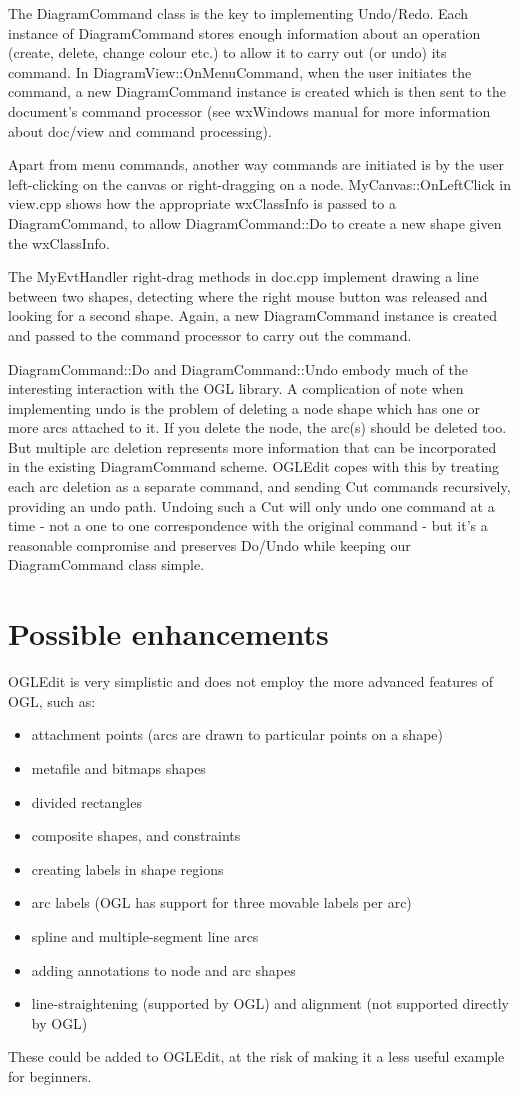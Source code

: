 The DiagramCommand class is the key to implementing Undo/Redo. Each instance of DiagramCommand
stores enough information about an operation (create, delete, change colour etc.) to allow
it to carry out (or undo) its command. In DiagramView::OnMenuCommand, when the user initiates the
command, a new DiagramCommand instance is created which is then sent to the document's
command processor (see wxWindows manual for more information about doc/view and command
processing).

Apart from menu commands, another way commands are initiated is by the user left-clicking on
the canvas or right-dragging on a node. MyCanvas::OnLeftClick in view.cpp shows how
the appropriate wxClassInfo is passed to a DiagramCommand, to allow DiagramCommand::Do
to create a new shape given the wxClassInfo.

The MyEvtHandler right-drag methods in doc.cpp implement drawing a line between
two shapes, detecting where the right mouse button was released and looking for a second
shape. Again, a new DiagramCommand instance is created and passed to the command
processor to carry out the command.

DiagramCommand::Do and DiagramCommand::Undo embody much of the
interesting interaction with the OGL library. A complication of note
when implementing undo is the problem of deleting a node shape which has
one or more arcs attached to it. If you delete the node, the arc(s)
should be deleted too. But multiple arc deletion represents more information
that can be incorporated in the existing DiagramCommand scheme. OGLEdit
copes with this by treating each arc deletion as a separate command, and
sending Cut commands recursively, providing an undo path. Undoing such a
Cut will only undo one command at a time - not a one to one
correspondence with the original command - but it's a reasonable
compromise and preserves Do/Undo while keeping our DiagramCommand class
simple.

\section{Possible enhancements}

OGLEdit is very simplistic and does not employ the more advanced features
of OGL, such as:

\begin{itemize}\itemsep=0pt
\item attachment points (arcs are drawn to particular points on a shape)
\item metafile and bitmaps shapes
\item divided rectangles
\item composite shapes, and constraints
\item creating labels in shape regions
\item arc labels (OGL has support for three movable labels per arc)
\item spline and multiple-segment line arcs
\item adding annotations to node and arc shapes
\item line-straightening (supported by OGL) and alignment (not supported directly by OGL)
\end{itemize}

These could be added to OGLEdit, at the risk of making it a less
useful example for beginners.
